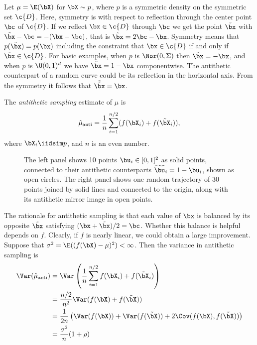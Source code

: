 Let \(\mu = \E(\bX)\) for \(\bX \sim p\), where \(p\) is a symmetric density on the symmetric set \(\c{D}\). Here, symmetry is with respect to reflection through the center point \(\bc\) of \(\c{D}\). If we reflect \(\bx \in \c{D}\) through \(\bc\) we get the point \(\tilde{\bx}\) with \(\tilde{\bx} - \bc = -(\bx - \bc)\), that is \(\tilde{\bx} = 2\bc - \bx\). Symmetry means that \(p(\tilde{\bx}) = p(\bx)\) including the constraint that \(\bx \in \c{D}\) if and only if \(\tilde{\bx} \in \c{D}\). For basic examples, when \(p\) is \(\Nor(0, \Sigma)\) then \(\tilde{\bx} = -\bx\), and when \(p\) is \(\U(0, 1)^d\) we have \(\tilde{\bx} = 1 - \bx\) componentwise. The antithetic counterpart of a random curve could be its reflection in the horizontal axis. From the symmetry it follows that \(\tilde{\tilde{\bx}} = \bx\).

The \textit{antithetic sampling} estimate of \(\mu\) is
\begin{equation} \label{eq:AntitheticSamplingEstimate}
	\hat{\mu}_{\mathrm{anti}} = \frac{1}{n} \sum_{i=1}^{n/2} (f(\bX_i) + f(\tilde{\bX}_i)),
\end{equation}
where \(\bX_i \iidsim p\), and \(n\) is an even number.

\begin{figure}[H]
	\centering
	
	\caption{The left panel shows 10 points \(\bu_i \in [0, 1]^2\) as solid points, connected to their antithetic counterparts \(\widetilde{\bu}_i = 1 - \bu_i\), shown as open circles. The right panel shows one random trajectory of 30 points joined by solid lines and connected to the origin, along with its antithetic mirror image in open points.}
	\label{fig:AntitheticVariates}
\end{figure}

The rationale for antithetic sampling is that each value of \(\bx\) is balanced by its opposite \(\tilde{\bx}\) satisfying \((\bx + \tilde{\bx})/2 = \bc\). Whether this balance is helpful depends on \(f\). Clearly, if \(f\) is nearly linear, we could obtain a large improvement. Suppose that \(\sigma^2 = \E((f(\bX) - \mu)^2) < \infty\). Then the variance in antithetic sampling is
\begin{align}
	\Var(\hat{\mu}_{\mathrm{anti}}) & = \Var\left(\frac{1}{n} \sum_{i=1}^{n/2} f(\bX_i) + f(\tilde{\bX}_i)\right) \notag                     \\
	                                & = \frac{n/2}{n^2} \Var(f(\bX) + f(\tilde{\bX})) \notag                                                 \\
	                                & = \frac{1}{2n} \left(\Var(f(\bX)) + \Var(f(\tilde{\bX})) + 2\Cov(f(\bX), f(\tilde{\bX}))\right) \notag \\
	                                & = \frac{\sigma^2}{n} (1+\rho) \label{eq:AntiVar}
\end{align}

